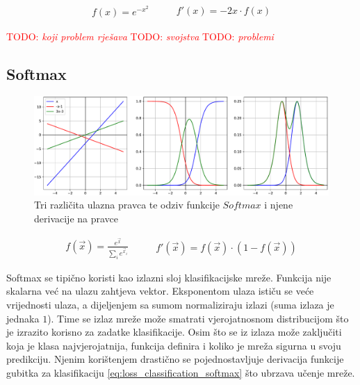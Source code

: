 \documentclass[times, utf8, numeric, diplomski]{fer}
\def\TODO#1{\noindent\textcolor{red}{TODO: \textit{#1}}\newline}
\def\todo#1{\TODO{#1}}
\begin{document}
\begin{equation}
\label{eq:gauss}
\begin{split}
f(x) = e^{-x^2}
\end{split}
\qquad
\begin{split}
f'(x) = -2x \cdot f(x)
\end{split}
\end{equation}

\todo{koji problem rješava}
\todo{svojstva}
\todo{problemi}
\fi %

\subsection{Softmax}

\begin{figure}[H]
\includegraphics[width=\textwidth]{func_Softmax.pdf}
\centering
\caption{Tri različita ulazna pravca te odziv funkcije $Softmax$ i njene derivacije na pravce}
\label{fig:softmax}
\end{figure}

\begin{equation}
\label{eq:softmax}
\begin{split}
f(\vec{x}) = \frac{e^{\vec{x}}}{\sum_ie^{\vec{x}_i}}
\end{split}
\qquad
\begin{split}
f'(\vec{x}) = f(\vec{x}) \cdot (1-f(\vec{x}))
\end{split}
\end{equation}

Softmax se tipično koristi kao izlazni sloj klasifikacijske mreže. Funkcija nije skalarna već na ulazu zahtjeva vektor. Eksponentom ulaza ističu se veće vrijednosti ulaza, a dijeljenjem sa sumom normaliziraju izlazi (suma izlaza je jednaka $1$). Time se izlaz mreže može smatrati vjerojatnosnom distribucijom što je izrazito korisno za zadatke klasifikacije. Osim što se iz izlaza može zaključiti koja je klasa najvjerojatnija, funkcija definira i koliko je mreža sigurna u svoju predikciju. Njenim korištenjem drastično se pojednostavljuje derivacija funkcije gubitka za klasifikaciju \eqref{eq:loss_classification_softmax} što ubrzava učenje mreže.
\end{document}
